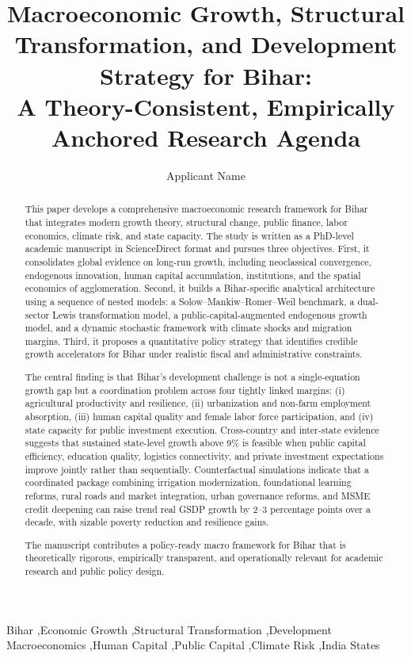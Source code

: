 \documentclass[preprint,12pt]{elsarticle}
\begin{document}
\begin{frontmatter}

\title{Macroeconomic Growth, Structural Transformation, and Development Strategy for Bihar: \\
A Theory-Consistent, Empirically Anchored Research Agenda}

\author{Applicant Name}
\address{Independent Researcher, Bihar and Development Macroeconomics Initiative}

\begin{abstract}
This paper develops a comprehensive macroeconomic research framework for Bihar that integrates modern growth theory, structural change, public finance, labor economics, climate risk, and state capacity. The study is written as a PhD-level academic manuscript in ScienceDirect format and pursues three objectives. First, it consolidates global evidence on long-run growth, including neoclassical convergence, endogenous innovation, human capital accumulation, institutions, and the spatial economics of agglomeration. Second, it builds a Bihar-specific analytical architecture using a sequence of nested models: a Solow--Mankiw--Romer--Weil benchmark, a dual-sector Lewis transformation model, a public-capital-augmented endogenous growth model, and a dynamic stochastic framework with climate shocks and migration margins. Third, it proposes a quantitative policy strategy that identifies credible growth accelerators for Bihar under realistic fiscal and administrative constraints.

The central finding is that Bihar's development challenge is not a single-equation growth gap but a coordination problem across four tightly linked margins: (i) agricultural productivity and resilience, (ii) urbanization and non-farm employment absorption, (iii) human capital quality and female labor force participation, and (iv) state capacity for public investment execution. Cross-country and inter-state evidence suggests that sustained state-level growth above 9\% is feasible when public capital efficiency, education quality, logistics connectivity, and private investment expectations improve jointly rather than sequentially. Counterfactual simulations indicate that a coordinated package combining irrigation modernization, foundational learning reforms, rural roads and market integration, urban governance reforms, and MSME credit deepening can raise trend real GSDP growth by 2--3 percentage points over a decade, with sizable poverty reduction and resilience gains.

The manuscript contributes a policy-ready macro framework for Bihar that is theoretically rigorous, empirically transparent, and operationally relevant for academic research and public policy design.
\end{abstract}

\begin{keyword}
Bihar \sep Economic Growth \sep Structural Transformation \sep Development Macroeconomics \sep Human Capital \sep Public Capital \sep Climate Risk \sep India States
\end{keyword}

\end{frontmatter}
\end{document}
